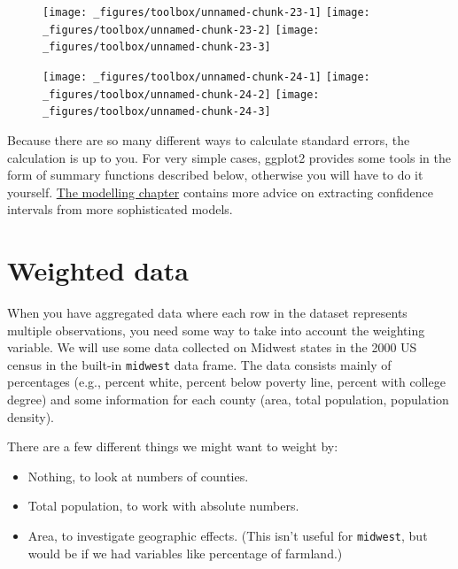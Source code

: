 \begin{figure}[H]
  \texttt{[image: \_figures/toolbox/unnamed-chunk-23-1]}%
  \texttt{[image: \_figures/toolbox/unnamed-chunk-23-2]}%
  \texttt{[image: \_figures/toolbox/unnamed-chunk-23-3]}
\end{figure}

\begin{Shaded}
\begin{Highlighting}[]
\StringTok{ }\NormalTok{()}
\StringTok{ }\NormalTok{()}
\StringTok{ }\NormalTok{()}
\end{Highlighting}
\end{Shaded}

\begin{figure}[H]
  \texttt{[image: \_figures/toolbox/unnamed-chunk-24-1]}%
  \texttt{[image: \_figures/toolbox/unnamed-chunk-24-2]}%
  \texttt{[image: \_figures/toolbox/unnamed-chunk-24-3]}
\end{figure}

Because there are so many different ways to calculate standard errors,
the calculation is up to you.  For very simple
cases, ggplot2 provides some tools in the form of summary functions
described below, otherwise you will have to do it yourself.
\protect\hyperlink{cha:modelling}{The modelling chapter} contains more
advice on extracting confidence intervals from more sophisticated
models.

\hypertarget{sec:weighting}{\section{Weighted
data}\label{sec:weighting}}

When you have aggregated data where each row in the dataset represents
multiple observations, you need some way to take into account the
weighting variable. We will use some data collected on Midwest states in
the 2000 US census in the built-in \texttt{midwest} data frame. The data
consists mainly of percentages (e.g., percent white, percent below
poverty line, percent with college degree) and some information for each
county (area, total population, population density). 

There are a few different things we might want to weight by:

\begin{itemize}
\tightlist
\item
  Nothing, to look at numbers of counties.
\item
  Total population, to work with absolute numbers.
\item
  Area, to investigate geographic effects. (This isn't useful for
  \texttt{midwest}, but would be if we had variables like percentage of
  farmland.)
\end{itemize}

